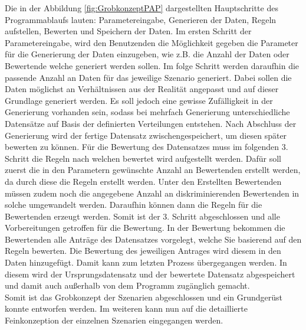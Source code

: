 \begin{onehalfspace}
Die in der Abbildung \ref{fig:GrobkonzeptPAP} dargestellten Hauptschritte des Programmablaufs lauten: Parametereingabe, Generieren der Daten, Regeln aufstellen, Bewerten und Speichern der Daten. Im ersten Schritt der Parametereingabe, wird den Benutzenden die Möglichkeit gegeben die Parameter für die Generierung der Daten einzugeben, wie z.B. die Anzahl der Daten oder Bewertende welche generiert werden sollen. Im folge Schritt werden daraufhin die passende Anzahl an Daten für das jeweilige Szenario generiert. Dabei sollen die Daten möglichst an Verhältnissen aus der Realität angepasst und auf dieser Grundlage generiert werden. Es soll jedoch eine gewisse Zufälligkeit in der Generierung vorhanden sein, sodass bei mehrfach Generierung unterschiedliche Datensätze auf Basis der definierten Verteilungen entstehen. Nach Abschluss der Generierung wird der fertige Datensatz zwischengespeichert, um diesen später bewerten zu können. Für die Bewertung des Datensatzes muss im folgenden 3. Schritt die Regeln nach welchen bewertet wird aufgestellt werden. Dafür soll zuerst die in den Parametern gewünschte Anzahl an Bewertenden erstellt werden, da durch diese die Regeln erstellt werden. Unter den Erstellten Bewertenden müssen zudem noch die angegebene Anzahl an diskriminierenden Bewertenden in solche umgewandelt werden. Daraufhin können dann die Regeln für die Bewertenden erzeugt werden. Somit ist der 3. Schritt abgeschlossen und alle Vorbereitungen getroffen für die Bewertung. In der Bewertung bekommen die Bewertenden alle Anträge des Datensatzes vorgelegt, welche Sie basierend auf den Regeln bewerten. Die Bewertung des jeweiligen Antrages wird diesem in den Daten hinzugefügt. Damit kann zum letzten Prozess übergegangen werden. In diesem wird der Ursprungsdatensatz und der bewertete Datensatz abgespeichert und damit auch au{\ss}erhalb von dem Programm zugänglich gemacht.\\
Somit ist das Grobkonzept der Szenarien abgeschlossen und ein Grundgerüst konnte entworfen werden. Im weiteren kann nun auf die detaillierte Feinkonzeption der einzelnen Szenarien eingegangen werden.

\end{onehalfspace}
